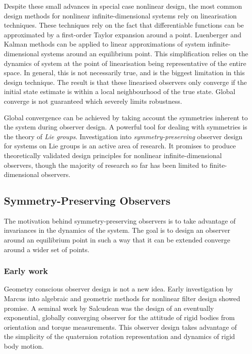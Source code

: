 Despite these small advances in special case nonlinear design, the most common design methods for nonlinear infinite-dimensional systems rely on linearisation techniques. These techniques rely on the fact that differentiable functions can be approximated by a first-order Taylor expansion around a point. Luenberger and Kalman methods can be applied to linear approximations of system infinite-dimensional systems around an equilibrium point. This simplification relies on the dynamics of system at the point of linearisation being representative of the entire space. In general, this is not necessarily true, and is the biggest limitation in this design technique. The result is that these linearised observers only converge if the initial state estimate is within a local neighbourhood of the true state. Global converge is not guaranteed which severely limits robustness.

Global convergence can be achieved by taking account the symmetries inherent to the system during observer design. A powerful tool for dealing with symmetries is the theory of \textit{Lie groups}. Investigation into \textit{symmetry-preserving} observer design for systems on Lie groups is an active area of research. It promises to produce theoretically validated design principles for nonlinear infinite-dimensional observers, though the majority of research so far has been limited to finite-dimensional observers.

\subsection{Symmetry-Preserving Observers}
The motivation behind symmetry-preserving observers is to take advantage of invariances in the dynamics of the system. The goal is to design an observer around an equilibrium point in such a way that it can be extended converge around a wider set of points.

\subsubsection{Early work}
Geometry conscious observer design is not a new idea. Early investigation by Marcus \cite{marcus1984algebraic} into algebraic and geometric methods for nonlinear filter design showed promise.
A seminal work by Salcudean \cite{salcudean1991globally} was the design of an eventually exponential, globally converging observer for the attitude of rigid bodies from orientation and torque measurements. This observer design takes advantage of the simplicity of the quaternion rotation representation and dynamics of rigid body motion.

